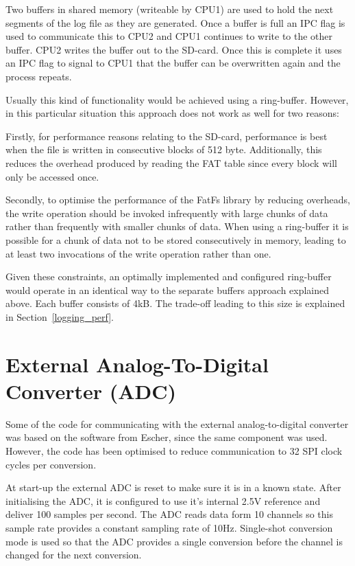 Two buffers in shared memory (writeable by CPU1) are used to hold the next segments of the log file as they are generated. Once a buffer is full an IPC flag is used to communicate this to CPU2 and CPU1 continues to write to the other buffer. CPU2 writes the buffer out to the SD-card. Once this is complete it uses an IPC flag to signal to CPU1 that the buffer can be overwritten again and the process repeats.

Usually this kind of functionality would be achieved using a ring-buffer. However, in this particular situation this approach does not work as well for two reasons:

Firstly, for performance reasons relating to the SD-card, performance is best when the file is written in consecutive blocks of 512 byte. Additionally, this reduces the overhead produced by reading the FAT table since every block will only be accessed once.

Secondly, to optimise the performance of the FatFs library by reducing overheads, the write operation should be invoked infrequently with large chunks of data rather than frequently with smaller chunks of data. When using a ring-buffer it is possible for a chunk of data not to be stored consecutively in memory, leading to at least two invocations of the write operation rather than one.

Given these constraints, an optimally implemented and configured ring-buffer would operate in an identical way to the separate buffers approach explained above. Each buffer consists of 4kB. The trade-off leading to this size is explained in Section~\ref{logging_perf}.

\section{External Analog-To-Digital Converter (ADC)}

Some of the code for communicating with the external analog-to-digital converter was based on the software from Escher, since the same component was used. However, the code has been optimised to reduce communication to 32 SPI clock cycles per conversion.

At start-up the external ADC is reset to make sure it is in a known state. After initialising the ADC, it is configured to use it's internal 2.5V reference and deliver 100 samples per second. The ADC reads data form 10 channels so this sample rate provides a constant sampling rate of 10Hz. Single-shot conversion mode is used so that the ADC provides a single conversion before the channel is changed for the next conversion.

